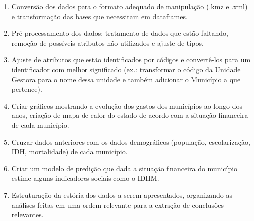 \documentclass{article}
\begin{document}
 \begin{enumerate}
   \item Conversão dos dados para o formato adequado de manipulação (.kmz e .xml) e transformação das bases que necessitam em dataframes.
   \item Pré-processamento dos dados: tratamento de dados que estão faltando, remoção de possíveis atributos não utilizados e ajuste de tipos.
   \item Ajuste de atributos que estão identificados por códigos e convertê-los para um identificador com melhor significado (ex.: transformar o código da Unidade Gestora para o nome dessa unidade e também adicionar o Município a que pertence).
   \item Criar gráficos mostrando a evolução dos gastos dos municípios ao longo dos anos, criação de mapa de calor do estado de acordo com a situação financeira de cada município.
   \item Cruzar dados anteriores com os dados demográficos (população, escolarização, IDH, mortalidade) de cada município.
   \item Criar um modelo de predição que dada a situação financeira do município estime alguns indicadores sociais como o IDHM.
   \item Estruturação da estória dos dados a serem apresentados, organizando as análises feitas em uma ordem relevante para a extração de conclusões relevantes.
 \end{enumerate}
\end{document}
